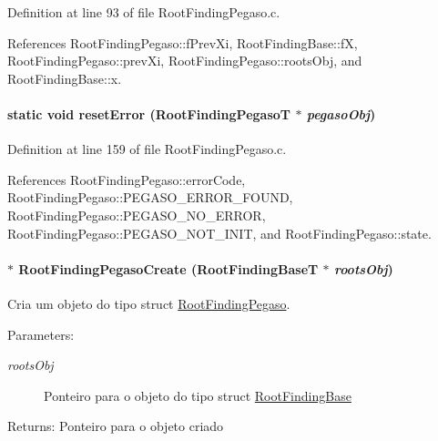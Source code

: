 Definition at line 93 of file RootFindingPegaso.c.

References RootFindingPegaso::fPrevXi, RootFindingBase::fX, RootFindingPegaso::prevXi, RootFindingPegaso::rootsObj, and RootFindingBase::x.\hypertarget{group____pegaso_g0496f8f88be7280598d9cce2a1e622f0}{
\paragraph[resetError]{\setlength{\rightskip}{0pt plus 5cm}static void resetError ({\bf RootFindingPegasoT} $\ast$ {\em pegasoObj})}\hfill}
\label{group____pegaso_g0496f8f88be7280598d9cce2a1e622f0}




Definition at line 159 of file RootFindingPegaso.c.

References RootFindingPegaso::errorCode, RootFindingPegaso::PEGASO\_\-ERROR\_\-FOUND, RootFindingPegaso::PEGASO\_\-NO\_\-ERROR, RootFindingPegaso::PEGASO\_\-NOT\_\-INIT, and RootFindingPegaso::state.\hypertarget{group____pegaso_g1717ab621ccdb5d78bc3133ad52805c2}{
\paragraph[RootFindingPegasoCreate]{$\ast$ RootFindingPegasoCreate ({\bf RootFindingBaseT} $\ast$ {\em rootsObj})}\hfill}
\label{group____pegaso_g1717ab621ccdb5d78bc3133ad52805c2}


Cria um objeto do tipo struct \hyperlink{structRootFindingPegaso}{RootFindingPegaso}. 

\begin{Desc}
\item[Parameters:]
\begin{description}
\item[{\em rootsObj}]Ponteiro para o objeto do tipo struct \hyperlink{structRootFindingBase}{RootFindingBase} \end{description}
\end{Desc}
\begin{Desc}
\item[Returns:]Ponteiro para o objeto criado \end{Desc}



